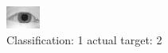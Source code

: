 \begin{figure}[h!]
\begin{center}
\includegraphics[width=0.60\columnwidth]{figures/ID862_class_1_target_2.png}
\end{center}
\caption{ Classification: 1 actual target: 2}
\label{fig:ID862_class_1_target_2}
\end{figure}
